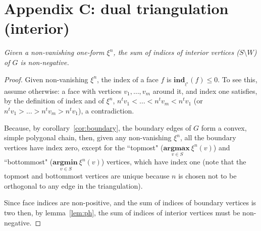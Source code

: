 \documentclass[11pt]{article}
\newcommand{\Sites}{S}
\begin{document}
\section*{Appendix C: dual triangulation (interior)}\label{app:interior}


\emph{
	Given a non-vanishing one-form $\xi^n$, the sum of indices of interior vertices ($\Sites\setminus W$) of $G$ is non-negative. 
}
\begin{proof}
Given non-vanishing $\xi^n$, 
the index of a face $f$ is $\mathbf{ind}_{_{\xi^n}}(f) \le 0$. 
To see this, assume otherwise: a face with vertices $v_1,\dots,v_m$ around it, and index one satisfies, by the
definition of index and of $\xi^n$, 
$n^t v_1 < \dots < n^t v_m < n^t v_1$ 
(or $n^t v_1 > \dots > n^t v_m > n^t v_1$), a
contradiction. 

Because, by corollary~\ref{cor:boundary}, the boundary edges of $G$ form a convex, 
	simple polygonal chain, then, given any non-vanishing $\xi^n$, all the boundary vertices have
index zero, except for the ``topmost" ($\underset{v\in \Sites}{\mathbf{argmax\ }} \xi^n(v)$) 
and ``bottommost" ($\underset{v\in \Sites}{\mathbf{argmin\ }} \xi^n(v)$) vertices, which have
index one (note that the topmost and bottommost vertices are unique because $n$ is chosen not to be orthogonal to any edge in the triangulation). 

Since face indices are non-positive, and the sum of indices of
boundary vertices is two then, by lemma~\ref{lem:ph},
the sum of indices of {interior} vertices must be non-negative. 
\end{proof}
\end{document}
